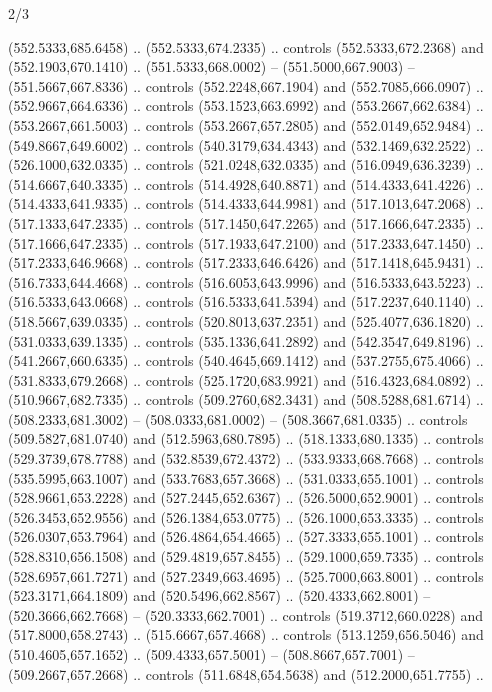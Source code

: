 \begin{flagdescription}{2/3}
\begin{scope}[xshift=0.5\flaglength,yshift=0.5\flagwidth,scale=\flagwidth/525.28]
\begin{scope}[y=0.1mm, x=0.1mm, yscale=-1,shift={(-381.5,-404)}]
\begin{scope}[shift={(5.25001,4.53053)},miter limit=4.00,line width=0.800\lw]
  (552.5333,685.6458) .. (552.5333,674.2335) .. controls (552.5333,672.2368) and
  (552.1903,670.1410) .. (551.5333,668.0002) -- (551.5000,667.9003) --
  (551.5667,667.8336) .. controls (552.2248,667.1904) and (552.7085,666.0907) ..
  (552.9667,664.6336) .. controls (553.1523,663.6992) and (553.2667,662.6384) ..
  (553.2667,661.5003) .. controls (553.2667,657.2805) and (552.0149,652.9484) ..
  (549.8667,649.6002) .. controls (540.3179,634.4343) and (532.1469,632.2522) ..
  (526.1000,632.0335) .. controls (521.0248,632.0335) and (516.0949,636.3239) ..
  (514.6667,640.3335) .. controls (514.4928,640.8871) and (514.4333,641.4226) ..
  (514.4333,641.9335) .. controls (514.4333,644.9981) and (517.1013,647.2068) ..
  (517.1333,647.2335) .. controls (517.1450,647.2265) and (517.1666,647.2335) ..
  (517.1666,647.2335) .. controls (517.1933,647.2100) and (517.2333,647.1450) ..
  (517.2333,646.9668) .. controls (517.2333,646.6426) and (517.1418,645.9431) ..
  (516.7333,644.4668) .. controls (516.6053,643.9996) and (516.5333,643.5223) ..
  (516.5333,643.0668) .. controls (516.5333,641.5394) and (517.2237,640.1140) ..
  (518.5667,639.0335) .. controls (520.8013,637.2351) and (525.4077,636.1820) ..
  (531.0333,639.1335) .. controls (535.1336,641.2892) and (542.3547,649.8196) ..
  (541.2667,660.6335) .. controls (540.4645,669.1412) and (537.2755,675.4066) ..
  (531.8333,679.2668) .. controls (525.1720,683.9921) and (516.4323,684.0892) ..
  (510.9667,682.7335) .. controls (509.2760,682.3431) and (508.5288,681.6714) ..
  (508.2333,681.3002) -- (508.0333,681.0002) -- (508.3667,681.0335) .. controls
  (509.5827,681.0740) and (512.5963,680.7895) .. (518.1333,680.1335) .. controls
  (529.3739,678.7788) and (532.8539,672.4372) .. (533.9333,668.7668) .. controls
  (535.5995,663.1007) and (533.7683,657.3668) .. (531.0333,655.1001) .. controls
  (528.9661,653.2228) and (527.2445,652.6367) .. (526.5000,652.9001) .. controls
  (526.3453,652.9556) and (526.1384,653.0775) .. (526.1000,653.3335) .. controls
  (526.0307,653.7964) and (526.4864,654.4665) .. (527.3333,655.1001) .. controls
  (528.8310,656.1508) and (529.4819,657.8455) .. (529.1000,659.7335) .. controls
  (528.6957,661.7271) and (527.2349,663.4695) .. (525.7000,663.8001) .. controls
  (523.3171,664.1809) and (520.5496,662.8567) .. (520.4333,662.8001) --
  (520.3666,662.7668) -- (520.3333,662.7001) .. controls (519.3712,660.0228) and
  (517.8000,658.2743) .. (515.6667,657.4668) .. controls (513.1259,656.5046) and
  (510.4605,657.1652) .. (509.4333,657.5001) -- (508.8667,657.7001) --
  (509.2667,657.2668) .. controls (511.6848,654.5638) and (512.2000,651.7755) ..

\end{scope}
\end{scope}
\end{scope}
\end{flagdescription}
